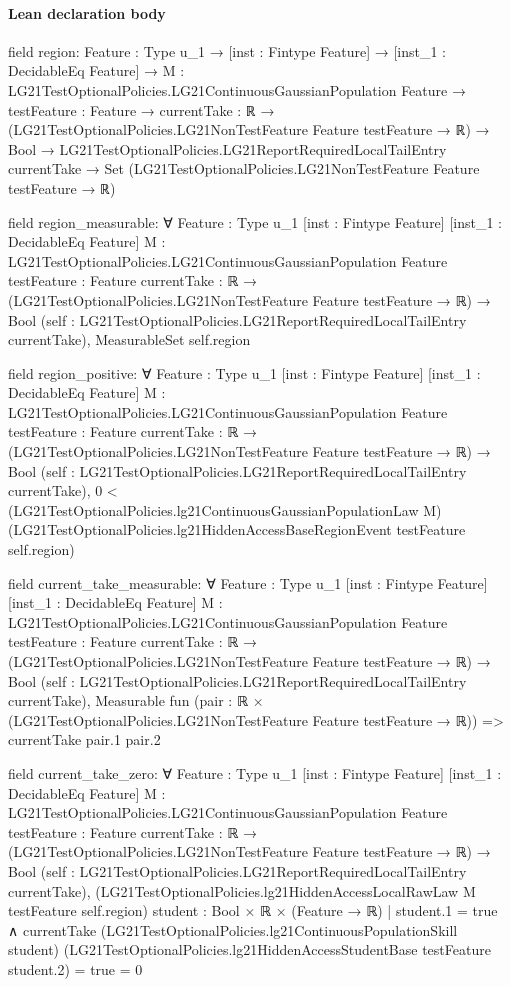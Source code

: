\documentclass[10pt]{article}
\begin{document}
\paragraph{Lean declaration body}
\begin{ReviewVerbatim}
field region:
{Feature : Type u_1} →
  [inst : Fintype Feature] →
    [inst_1 : DecidableEq Feature] →
      {M : LG21TestOptionalPolicies.LG21ContinuousGaussianPopulation Feature} →
        {testFeature : Feature} →
          {currentTake : ℝ → (LG21TestOptionalPolicies.LG21NonTestFeature Feature testFeature → ℝ) → Bool} →
            LG21TestOptionalPolicies.LG21ReportRequiredLocalTailEntry currentTake →
              Set (LG21TestOptionalPolicies.LG21NonTestFeature Feature testFeature → ℝ)

field region_measurable:
∀ {Feature : Type u_1} [inst : Fintype Feature] [inst_1 : DecidableEq Feature]
  {M : LG21TestOptionalPolicies.LG21ContinuousGaussianPopulation Feature} {testFeature : Feature}
  {currentTake : ℝ → (LG21TestOptionalPolicies.LG21NonTestFeature Feature testFeature → ℝ) → Bool}
  (self : LG21TestOptionalPolicies.LG21ReportRequiredLocalTailEntry currentTake), MeasurableSet self.region

field region_positive:
∀ {Feature : Type u_1} [inst : Fintype Feature] [inst_1 : DecidableEq Feature]
  {M : LG21TestOptionalPolicies.LG21ContinuousGaussianPopulation Feature} {testFeature : Feature}
  {currentTake : ℝ → (LG21TestOptionalPolicies.LG21NonTestFeature Feature testFeature → ℝ) → Bool}
  (self : LG21TestOptionalPolicies.LG21ReportRequiredLocalTailEntry currentTake),
  0 <
    (LG21TestOptionalPolicies.lg21ContinuousGaussianPopulationLaw M)
      (LG21TestOptionalPolicies.lg21HiddenAccessBaseRegionEvent testFeature self.region)

field current_take_measurable:
∀ {Feature : Type u_1} [inst : Fintype Feature] [inst_1 : DecidableEq Feature]
  {M : LG21TestOptionalPolicies.LG21ContinuousGaussianPopulation Feature} {testFeature : Feature}
  {currentTake : ℝ → (LG21TestOptionalPolicies.LG21NonTestFeature Feature testFeature → ℝ) → Bool}
  (self : LG21TestOptionalPolicies.LG21ReportRequiredLocalTailEntry currentTake),
  Measurable fun (pair : ℝ × (LG21TestOptionalPolicies.LG21NonTestFeature Feature testFeature → ℝ)) =>
    currentTake pair.1 pair.2

field current_take_zero:
∀ {Feature : Type u_1} [inst : Fintype Feature] [inst_1 : DecidableEq Feature]
  {M : LG21TestOptionalPolicies.LG21ContinuousGaussianPopulation Feature} {testFeature : Feature}
  {currentTake : ℝ → (LG21TestOptionalPolicies.LG21NonTestFeature Feature testFeature → ℝ) → Bool}
  (self : LG21TestOptionalPolicies.LG21ReportRequiredLocalTailEntry currentTake),
  (LG21TestOptionalPolicies.lg21HiddenAccessLocalRawLaw M testFeature self.region)
      {student : Bool × ℝ × (Feature → ℝ) |
        student.1 = true ∧
          currentTake (LG21TestOptionalPolicies.lg21ContinuousPopulationSkill student)
              (LG21TestOptionalPolicies.lg21HiddenAccessStudentBase testFeature student.2) =
            true} =
    0


\end{ReviewVerbatim}
\end{document}
